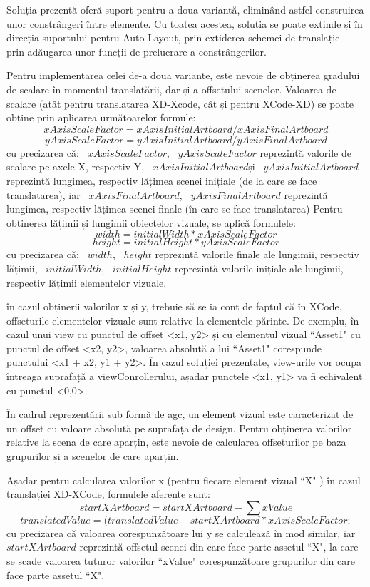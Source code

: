 Soluția prezentă oferă suport pentru a doua variantă, eliminând astfel construirea unor constrângeri între elemente. Cu toatea acestea, soluția se poate extinde și în direcția suportului pentru Auto-Layout, prin extiderea schemei de translație - prin adăugarea unor funcții de prelucrare a constrângerilor.

Pentru implementarea celei de-a doua variante, este nevoie de obținerea gradului de scalare în momentul translatării, dar și a offsetului scenelor. Valoarea de scalare (atât pentru translatarea XD-Xcode, cât și pentru XCode-XD) se poate obține prin aplicarea următoarelor formule: 
\[ xAxisScaleFactor =  xAxisInitialArtboard/ xAxisFinalArtboard\]
\[ yAxisScaleFactor =  yAxisInitialArtboard/ yAxisFinalArtboard\]
cu precizarea că:
 ~$xAxisScaleFactor$, ~$yAxisScaleFactor$ reprezintă valorile de scalare pe axele X, respectiv Y,  ~$xAxisInitialArtboard$și ~$yAxisInitialArtboard$ reprezintă lungimea, respectiv lățimea scenei inițiale (de la care se face translatarea), iar ~$xAxisFinalArtboard$, ~$yAxisFinalArtboard$ reprezintă lungimea, respectiv lățimea scenei finale (în care se face translatarea)
Pentru obținerea lățimii și lungimii obiectelor vizuale, se aplică formulele:
\[ width =  initialWidth *  xAxisScaleFactor\]
\[ height =  initialHeight * yAxisScaleFactor\]
cu precizarea că:
~$width$, ~$height$ reprezintă valorile finale ale lungimii, respectiv lățimii, ~$initialWidth$, ~$initialHeight$ reprezintă valorile inițiale ale lungimii, respectiv lățimii elementelor vizuale.

în cazul obținerii valorilor x și y, trebuie să se ia cont de faptul că în XCode, offseturile elementelor vizuale sunt relative la elementele părinte. De exemplu, în cazul unui view cu punctul de offset <x1, y2> și cu elementul vizual ``Asset1" cu punctul de offset <x2, y2>, valoarea absolută a lui ``Asset1" corespunde punctului <x1 + x2, y1 + y2>. În cazul soluției prezentate, view-urile vor ocupa întreaga suprafață a viewConrollerului, așadar punctele <x1, y1> va fi echivalent cu punctul <0,0>.

În cadrul reprezentării sub formă de agc, un element vizual este caracterizat de un offset cu valoare absolută pe suprafața de design. Pentru obținerea valorilor relative la scena de care aparțin, este nevoie de calcularea offseturilor pe baza grupurilor și a scenelor de care aparțin.

Așadar pentru calcularea valorilor x (pentru fiecare element vizual ``X" ) în cazul translației XD-XCode, formulele aferente sunt:
        \[ startXArtboard = startXArtboard - \sum{xValue} \]
        \[ translatedValue = (translatedValue - startXArtboard * xAxisScaleFactor;\]
cu precizarea că valoarea corespunzătoare lui y se calculează în mod similar, iar ~$startXArtboard$ reprezintă offsetul scenei din care face parte assetul ``X", la care se scade valoarea tuturor valorilor ``xValue" corespunzătoare grupurilor din care face parte assetul ``X". 

